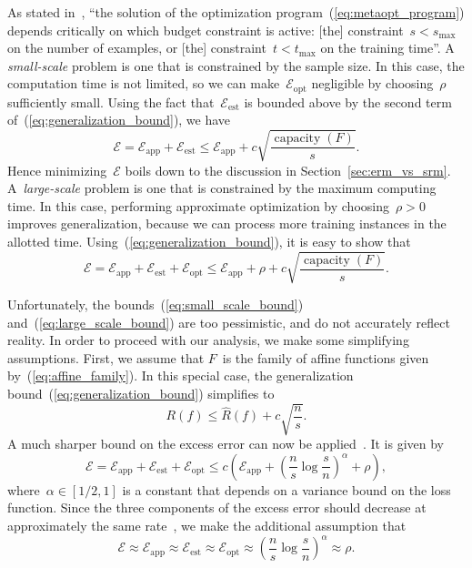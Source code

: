 \documentclass[11pt,a4paper]{article}
\numberwithin{equation}{section}
\newcommand{\capacity}{\operatorname{capacity}}
\newcommand{\apperr}{\mathcal{E}_{\mathrm{app}}}
\newcommand{\esterr}{\mathcal{E}_{\mathrm{est}}}
\newcommand{\opterr}{\mathcal{E}_{\mathrm{opt}}}
\begin{document}
As stated in~\citet{bousquet2008tradeoffs}, ``the solution of the optimization
program~(\ref{eq:metaopt_program}) depends critically on which budget constraint
is active: [the] constraint~$s < s_{\text{max}}$ on the number of examples, or
[the] constraint~$t < t_{\text{max}}$ on the training time''. A
\emph{small-scale} problem is one that is constrained by the sample size. In
this case, the computation time is not limited, so we can make~$\opterr$
negligible by choosing~$\rho$ sufficiently small. Using the fact that~$\esterr$
is bounded above by the second term of~(\ref{eq:generalization_bound}), we have
\begin{equation}
	\mathcal{E} = \apperr + \esterr \leq \apperr + c
		\sqrt{\frac{\capacity(F)}{s}}.
	\label{eq:small_scale_bound}
\end{equation}
Hence minimizing~$\mathcal{E}$ boils down to the discussion in
Section~\ref{sec:erm_vs_srm}. A~\emph{large-scale} problem is one that is
constrained by the maximum computing time. In this case, performing approximate
optimization by choosing~$\rho > 0$ improves generalization, because we can
process more training instances in the allotted time.
Using~(\ref{eq:generalization_bound}), it is easy to show that
\begin{equation}
	\mathcal{E}
	= \apperr + \esterr + \opterr
	\leq \apperr + \rho + c\sqrt{\frac{\capacity(F)}{s}}.
	\label{eq:large_scale_bound}
\end{equation}

Unfortunately, the bounds~(\ref{eq:small_scale_bound})
and~(\ref{eq:large_scale_bound}) are too pessimistic, and do not accurately
reflect reality. In order to proceed with our analysis, we make some simplifying
assumptions. First, we assume that $F$~is the family of affine functions given
by~(\ref{eq:affine_family}). In this special case, the generalization
bound~(\ref{eq:generalization_bound}) simplifies to
\[
	R(f) \leq \hat{R}(f) + c \sqrt{\frac{n}{s}}.
\]
A much sharper bound on the excess error can now be
applied~\citep{bousquet2008tradeoffs}. It is given by
\begin{equation}
	\mathcal{E}
	= \apperr + \esterr + \opterr
	\leq c \left( \apperr + \left(\frac{n}{s}\log\frac{s}{n}\right)^\alpha +
		\rho \right),
	\label{eq:fast_rate_bound}
\end{equation}
where~$\alpha \in [1/2, 1]$ is a constant that depends on a variance bound on
the loss function. Since the three components of the excess error should
decrease at approximately the same rate~\citep{bousquet2008tradeoffs}, we make
the additional assumption that
\begin{equation}
	\mathcal{E} \approx \apperr \approx \esterr \approx \opterr \approx
		\left(\frac{n}{s}\log\frac{s}{n}\right)^\alpha \approx \rho.
	\label{eq:error_equiv}
\end{equation}
\end{document}
